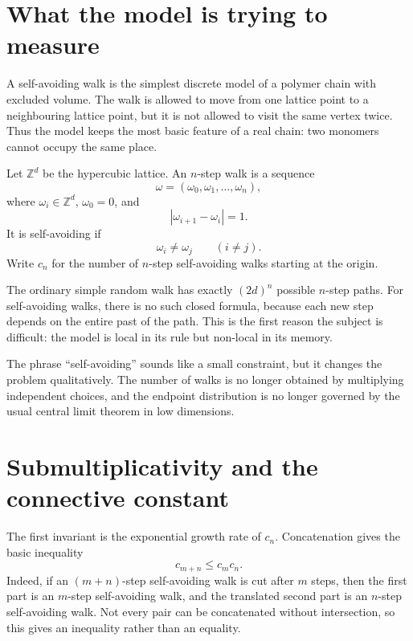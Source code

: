 
\section{What the model is trying to measure}

A self-avoiding walk is the simplest discrete model of a polymer chain with excluded volume.  The walk is allowed to move from one lattice point to a neighbouring lattice point, but it is not allowed to visit the same vertex twice.  Thus the model keeps the most basic feature of a real chain: two monomers cannot occupy the same place.

Let \(\mathbb Z^d\) be the hypercubic lattice.  An \(n\)-step walk is a sequence
\[
  \omega=(\omega_0,\omega_1,\ldots,\omega_n),
\]
where \(\omega_i\in\mathbb Z^d\), \(\omega_0=0\), and
\[
  |\omega_{i+1}-\omega_i|=1.
\]
It is self-avoiding if
\[
  \omega_i\ne \omega_j \qquad (i\ne j).
\]
Write \(c_n\) for the number of \(n\)-step self-avoiding walks starting at the origin.

The ordinary simple random walk has exactly \((2d)^n\) possible \(n\)-step paths.  For self-avoiding walks, there is no such closed formula, because each new step depends on the entire past of the path.  This is the first reason the subject is difficult: the model is local in its rule but non-local in its memory.

\begin{remark}
The phrase ``self-avoiding'' sounds like a small constraint, but it changes the problem qualitatively.  The number of walks is no longer obtained by multiplying independent choices, and the endpoint distribution is no longer governed by the usual central limit theorem in low dimensions.
\end{remark}

\section{Submultiplicativity and the connective constant}

The first invariant is the exponential growth rate of \(c_n\).  Concatenation gives the basic inequality
\[
  c_{m+n}\le c_m c_n.
\]
Indeed, if an \((m+n)\)-step self-avoiding walk is cut after \(m\) steps, then the first part is an \(m\)-step self-avoiding walk, and the translated second part is an \(n\)-step self-avoiding walk.  Not every pair can be concatenated without intersection, so this gives an inequality rather than an equality.

